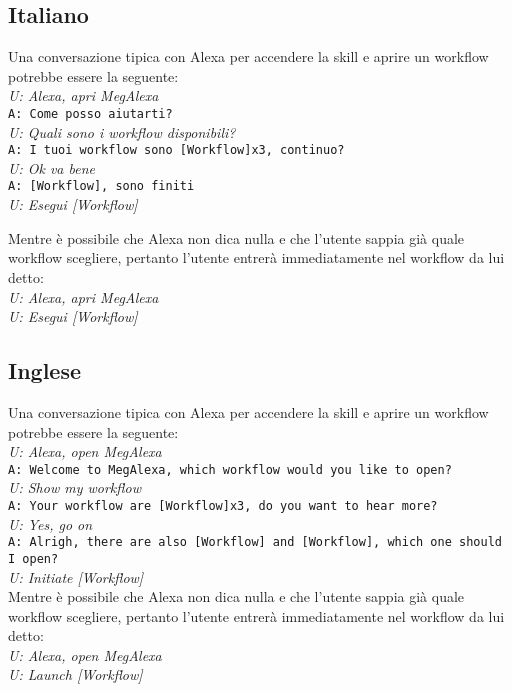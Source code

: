 \subsection{Italiano}
Una conversazione tipica con Alexa per accendere la skill e aprire un workflow potrebbe essere la seguente:\\
\newline
\textit{U: Alexa, apri MegAlexa} \\
\texttt{A: Come posso aiutarti?} \\
\textit{U: Quali sono i workflow disponibili?} \\
\texttt{A: I tuoi workflow sono [Workflow]x3, continuo?} \\
\textit{U: Ok va bene} \\
\texttt{A: [Workflow], sono finiti} \\
\textit{U: Esegui [Workflow]}

Mentre è possibile che Alexa non dica nulla e che l'utente sappia già quale workflow scegliere, pertanto l'utente entrerà immediatamente nel workflow da lui detto: \\
\newline
\textit{U: Alexa, apri MegAlexa}\\
\textit{U: Esegui [Workflow]}

\subsection{Inglese}
Una conversazione tipica con Alexa per accendere la skill e aprire un workflow potrebbe essere la seguente:\\
\newline
\textit{U: Alexa, open MegAlexa} \\
\texttt{A: Welcome to MegAlexa, which workflow would you like to open?}\\
\textit{U: Show my workflow}\\
\texttt{A: Your workflow are [Workflow]x3, do you want to hear more?}\\
\textit{U: Yes, go on}\\
\texttt{A: Alrigh, there are also [Workflow] and [Workflow], which one should I open?}\\
\textit{U: Initiate [Workflow]} \\

Mentre è possibile che Alexa non dica nulla e che l'utente sappia già quale workflow scegliere, pertanto l'utente entrerà immediatamente nel workflow da lui detto: \\
\newline
\textit{U: Alexa, open MegAlexa}\\
\textit{U: Launch [Workflow]}

